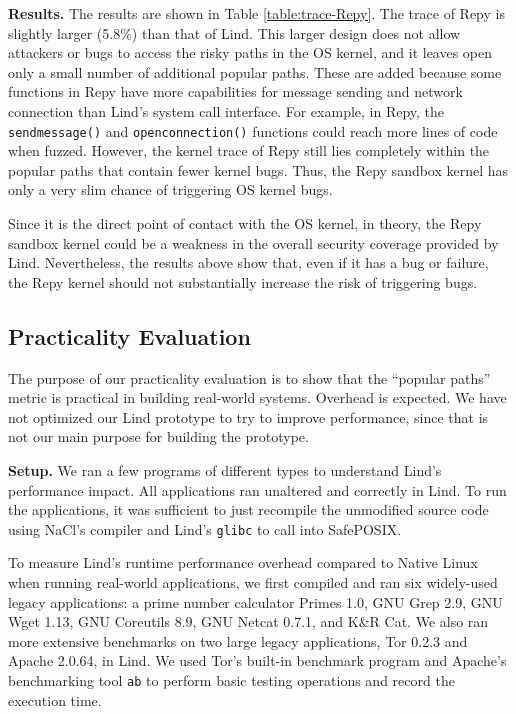 {{{\noindent
\textbf{Results.}
The results are shown in Table \ref{table:trace-Repy}.
The trace of Repy is slightly larger (5.8\%) than that of Lind.
This larger design does not allow attackers or bugs to
access the risky paths in the OS kernel, and it leaves open only a small number of
additional popular paths. These are added because some functions in Repy
have more capabilities for message sending and network connection than Lind's
system call interface.
For example, in Repy, the
\texttt{sendmessage()} and \texttt{openconnection()}
functions could reach more lines of code when fuzzed. However, the kernel
trace of Repy still lies completely within the popular paths that
contain fewer kernel bugs. Thus, the Repy sandbox kernel
has only a very slim chance of triggering OS kernel bugs.

Since it is the direct point of contact with the OS kernel, in theory, the Repy
 sandbox kernel could be a weakness in the overall security coverage provided by Lind.
Nevertheless, the results above show that, even if it has a
bug or failure, the Repy kernel should not substantially increase the risk of triggering bugs.

\subsection{Practicality Evaluation}
\label{Performance-Evaluation}

The purpose of our practicality evaluation is to show that the
``popular paths'' metric is practical in building real-world systems. Overhead is expected.
We have not optimized our Lind prototype to try to improve performance, since that is not
our main purpose for building the prototype.


\noindent
\textbf{Setup.}
We ran a few programs of different types to understand Lind's performance
impact. All applications ran unaltered and correctly in Lind. To run the
applications, it was sufficient to just recompile the unmodified
source code using NaCl's compiler and Lind's \texttt{glibc} to call
into SafePOSIX.

To measure Lind's runtime performance overhead compared to Native Linux
 when running real-world applications,
we first compiled and ran six widely-used legacy applications:
a prime number calculator Primes 1.0,
GNU Grep 2.9, GNU Wget 1.13, GNU Coreutils 8.9,
GNU Netcat 0.7.1, and K\&R Cat.
We also ran more extensive benchmarks on two large legacy applications,
Tor 0.2.3 and Apache 2.0.64, in Lind.
We used Tor's built-in benchmark program and Apache's benchmarking tool
\texttt{ab} to perform basic testing operations and record the execution time.

}}}

